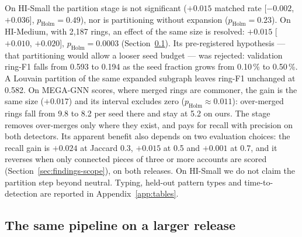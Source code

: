 On HI-Small the partition stage is not significant ($+0.015$ matched rate
[$-0.002$, $+0.036$], $p_{\mathrm{Holm}}=0.49$), nor is partitioning without expansion
($p_{\mathrm{Holm}}=0.23$). On HI-Medium, with 2{,}187 rings, an effect of the same size is
resolved: $+0.015$ [$+0.010$, $+0.020$], $p_{\mathrm{Holm}}=0.0003$
(Section~\ref{sec:results-hm}).
Its pre-registered hypothesis --- that partitioning would allow a
looser seed budget --- was rejected: validation ring-F1 falls from 0.593 to 0.194 as the seed
fraction grows from 0.10\,\% to 0.50\,\%. A Louvain partition of the same expanded subgraph
leaves ring-F1 unchanged at 0.582.
On MEGA-GNN scores, where merged rings are commoner, the gain is the same size ($+0.017$)
and its interval excludes zero ($p_{\mathrm{Holm}} \approx 0.011$): over-merged rings fall
from 9.8 to 8.2 per seed there and stay at 5.2 on ours. The stage removes over-merges only
where they exist, and pays for recall with precision on both detectors.
Its apparent benefit also depends on two evaluation choices: the recall gain is $+0.024$ at
Jaccard 0.3, $+0.015$ at 0.5 and $+0.001$ at 0.7, and it reverses when only connected pieces
of three or more accounts are scored (Section~\ref{sec:findings-scope}), on both releases.
On HI-Small we do not claim the partition step beyond neutral. Typing, held-out pattern types and time-to-detection are
reported in Appendix~\ref{app:tables}.

\subsection{The same pipeline on a larger release}
\label{sec:results-hm}

